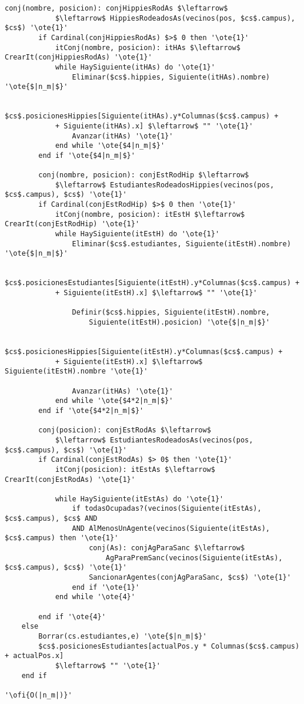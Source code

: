 \begin{lstlisting}[mathescape]
		conj(nombre, posicion): conjHippiesRodAs $\leftarrow$
			$\leftarrow$ HippiesRodeadosAs(vecinos(pos, $cs$.campus), $cs$) '\ote{1}'
		if Cardinal(conjHippiesRodAs) $>$ 0 then '\ote{1}'
			itConj(nombre, posicion): itHAs $\leftarrow$ CrearIt(conjHippiesRodAs) '\ote{1}'
			while HaySiguiente(itHAs) do '\ote{1}'
				Eliminar($cs$.hippies, Siguiente(itHAs).nombre) '\ote{$|n_m|$}'

				$cs$.posicionesHippies[Siguiente(itHAs).y*Columnas($cs$.campus) +
			+ Siguiente(itHAs).x] $\leftarrow$ "" '\ote{1}'
				Avanzar(itHAs) '\ote{1}'
			end while '\ote{$4|n_m|$}'
		end if '\ote{$4|n_m|$}'

		conj(nombre, posicion): conjEstRodHip $\leftarrow$
			$\leftarrow$ EstudiantesRodeadosHippies(vecinos(pos, $cs$.campus), $cs$) '\ote{1}'
		if Cardinal(conjEstRodHip) $>$ 0 then '\ote{1}'
			itConj(nombre, posicion): itEstH $\leftarrow$ CrearIt(conjEstRodHip) '\ote{1}'
			while HaySiguiente(itEstH) do '\ote{1}'
				Eliminar($cs$.estudiantes, Siguiente(itEstH).nombre) '\ote{$|n_m|$}'

				$cs$.posicionesEstudiantes[Siguiente(itEstH).y*Columnas($cs$.campus) +
			+ Siguiente(itEstH).x] $\leftarrow$ "" '\ote{1}'

				Definir($cs$.hippies, Siguiente(itEstH).nombre,
					Siguiente(itEstH).posicion) '\ote{$|n_m|$}'

				$cs$.posicionesHippies[Siguiente(itEstH).y*Columnas($cs$.campus) +
			+ Siguiente(itEstH).x] $\leftarrow$ Siguiente(itEstH).nombre '\ote{1}'

				Avanzar(itHAs) '\ote{1}'
			end while '\ote{$4*2|n_m|$}'
		end if '\ote{$4*2|n_m|$}'

		conj(posicion): conjEstRodAs $\leftarrow$
			$\leftarrow$ EstudiantesRodeadosAs(vecinos(pos, $cs$.campus), $cs$) '\ote{1}'
		if Cardinal(conjEstRodAs) $> 0$ then '\ote{1}'
			itConj(posicion): itEstAs $\leftarrow$ CrearIt(conjEstRodAs) '\ote{1}'

			while HaySiguiente(itEstAs) do '\ote{1}'
				if todasOcupadas?(vecinos(Siguiente(itEstAs), $cs$.campus), $cs$ AND
				AND AlMenosUnAgente(vecinos(Siguiente(itEstAs), $cs$.campus) then '\ote{1}'
					conj(As): conjAgParaSanc $\leftarrow$
						AgParaPremSanc(vecinos(Siguiente(itEstAs), $cs$.campus), $cs$) '\ote{1}'
					SancionarAgentes(conjAgParaSanc, $cs$) '\ote{1}'
				end if '\ote{1}'
			end while '\ote{4}'

		end if '\ote{4}'
	else
		Borrar(cs.estudiantes,e) '\ote{$|n_m|$}'
		$cs$.posicionesEstudiantes[actualPos.y * Columnas($cs$.campus) + actualPos.x]
			$\leftarrow$ "" '\ote{1}'
	end if

'\ofi{O(|n_m|)}'
\end{lstlisting}

